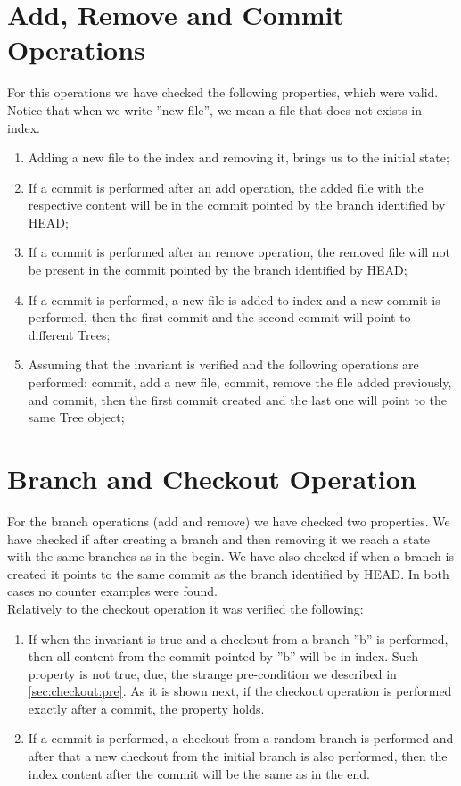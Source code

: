 \section{Add, Remove and Commit Operations}
For this operations we have checked the following properties, which
were valid. Notice that when we write ''new file'', we mean a file
that does not exists in index.
\begin{enumerate}
   \item Adding a new file to the index and removing it, brings us to the
   initial state;
   \item If a commit is performed after an add operation, the added
   file with the respective content will be in the commit pointed 
   by the branch identified by HEAD;
   \item If a commit is performed after an remove operation, the
   removed file will not be present in the commit pointed by the
   branch identified by HEAD;
   \item If a commit is performed, a new file is added to index and a
   new commit is performed, then the first commit and the second
   commit will point to different Trees;
   \item Assuming that the invariant is verified and the following operations are
   performed: commit, add a new file, commit, remove the file added
   previously, and commit, then the first commit created and the last one
   will point to the same Tree object;
\end{enumerate}


\section{Branch and Checkout Operation}
For the branch operations (add and remove) we have checked two
properties. We have checked if after creating a branch and then
removing it we reach a state with the same branches as in the begin.
We have also checked if when a branch is created it points to the same
commit as the branch identified by HEAD. In both cases no counter
examples were found.\\

Relatively to the checkout operation it was verified the following:
\begin{enumerate}
   \item If when the invariant is
   true and a checkout from a branch ''b'' is performed, then all content
   from the commit pointed by ''b'' will be in index. Such property is
   not true, due, the strange pre-condition we described in
   \ref{sec:checkout:pre}. As it is shown next, if the checkout
   operation is performed exactly after a commit, the property holds.
   \item If a commit is performed, a checkout from a random branch is
   performed and after that a new checkout from the initial branch is also
   performed, then the index content after the commit will be the same
   as in the end.
\end{enumerate}

